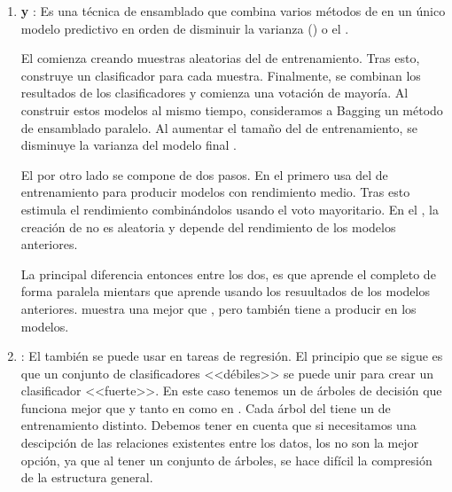 \begin{enumerate}
\begin{algorithm}[H]

        \end{algorithm}

  \item \textbf{ y }: Es una técnica de ensamblado que combina varios métodos de  en un único modelo predictivo en orden de disminuir la varianza () o el .

        El  comienza creando muestras aleatorias del  de entrenamiento. Tras esto, construye un clasificador para cada muestra. Finalmente, se combinan los resultados de los clasificadores y comienza una votación de mayoría. Al construir estos modelos al mismo tiempo, consideramos a Bagging un método de ensamblado paralelo. Al aumentar el tamaño del  de entrenamiento, se disminuye la varianza del modelo final .

        El  por otro lado se compone de dos pasos. En el primero usa  del  de entrenamiento para producir modelos con rendimiento medio. Tras esto estimula el rendimiento combinándolos usando el voto mayoritario. En el , la creación de  no es aleatoria y depende del rendimiento de los modelos anteriores.

        La principal diferencia entonces entre los dos, es que  aprende el  completo de forma paralela mientars que  aprende usando los resuultados de los modelos anteriores.  muestra una mejor  que  , pero también tiene a producir  en los modelos.

  \item \textbf{}: El  también se puede usar en tareas de regresión. El principio que se sigue es que un conjunto de clasificadores <<débiles>> se puede unir para crear un clasificador <<fuerte>>. En este caso tenemos un  de árboles de decisión que funciona mejor que  y  tanto en  como en . Cada árbol del  tiene un  de entrenamiento distinto. Debemos tener en cuenta que si necesitamos una descipción de las relaciones existentes entre los datos, los  no son la mejor opción, ya que al tener un conjunto de árboles, se hace difícil la compresión de la estructura general.


\end{enumerate}
